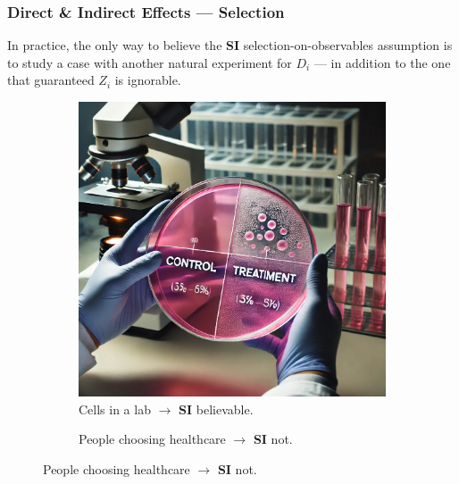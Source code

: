 \documentclass[dvipsnames,handout]{beamer} %
\begin{document}
\begin{frame}[noframenumbering]
    \frametitle{Direct \& Indirect Effects --- Selection}
    In practice, the only way to believe the \textbf{SI} selection-on-observables assumption is to study a case with another natural experiment for $D_i$ --- in addition to the one that guaranteed $Z_i$ is ignorable.
    \vskip-0.5cm
    \begin{figure}[h!]
        \centering
        \singlespacing
        \begin{subfigure}[c]{0.475\textwidth}
            \centering
            \caption{Cells in a lab
                $\to$ \textbf{SI} believable.}
            \includegraphics[width=\textwidth]{
                presentation-files/headlines/science-lab.png}
        \end{subfigure}
        \begin{subfigure}[c]{0.475\textwidth}
            \centering
            \caption{People choosing healthcare
                $\to$ \textbf{SI} not.}

\end{subfigure}
\end{figure}
\end{frame}
\end{document}
